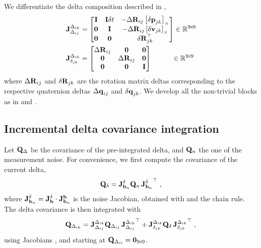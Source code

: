 We differentiate the delta composition  described in ,
%
\begin{subequations}\label{equ:jac_composition}
\begin{align}
{{\bf J}^{\Delta_{ik}}_{\Delta_{ij}}} &= \begin{bmatrix}
{\bf I}  & {\bf I}\delta t & - {\Delta{\bf R}}_{ij}  \left[{\delta{\bf p}}_{jk}\right]_\times  \\
\bf0  & {\bf I}    & - {\Delta{\bf R}}_{ij}  \left[{\delta{\bf v}}_{jk}\right]_\times \\
\bf0  & \bf0    &   {\delta{\bf R}}_{jk}^{\top} 
\end{bmatrix} 
\in {\mathbb R}^{9\!\times\!9}
\\
{{\bf J}^{\Delta_{ik}}_{\delta_{jk}}} &= \begin{bmatrix}
{\Delta{\bf R}}_{ij} & \bf0     & \bf0 \\
\bf0     & {\Delta{\bf R}}_{ij} & \bf0 \\
\bf0     & \bf0     & {\bf I}  
\end{bmatrix}
~~~~~~~~~\in {\mathbb R}^{9\!\times\!9}
\end{align}
\end{subequations}
%
where ${\Delta{\bf R}}_{ij}$ and ${\delta{\bf R}}_{jk}$ are the rotation matrix deltas corresponding to the respective quaternion deltas ${\Delta{\bf q}}_{ij}$ and ${\delta{\bf q}}_{jk}$. 
We develop all the non-trivial blocks as in  and .


\subsection{Incremental delta covariance integration}

Let ${\bf Q}_\Delta$ be the covariance of the pre-integrated delta, and ${\bf Q}_n$ the one of the measurement noise. For convenience, we first compute the covariance of the current delta,
%
\begin{align}
{\bf Q}_\delta =  {{\bf J}^{\delta}_{{\bf b}_n}}{\bf Q}_n\,{{\bf J}^{\delta}_{{\bf b}_n}}^{\top}
~,
\end{align}
%
where ${{\bf J}^{\delta}_{{\bf b}_n}} = {{\bf J}^{\delta}_{{\bf b}}} \cdot {{\bf J}^{{\bf b}}_{{\bf b}_n}}
$ is the noise Jacobian, obtained with  and the chain rule.
The delta covariance is then integrated with
%
\begin{align}
{\bf Q}_{\Delta_{ik}} = {{\bf J}^{\Delta_{ik}}_{\Delta_{ij}}}{\bf Q}_{\Delta_{ij}}\,{{\bf J}^{\Delta_{ik}}_{\Delta_{ij}}}^{\top} + {{\bf J}^{\Delta_{ik}}_{\delta_{jk}}}{\bf Q}_\delta\,{{\bf J}^{\Delta_{ik}}_{\delta_{jk}}}^{\top}
~,
\end{align}
%
using Jacobians , and starting at ${\bf Q}_{\Delta_{ii}}={\bf0}_{9\!\times\!9}$.



